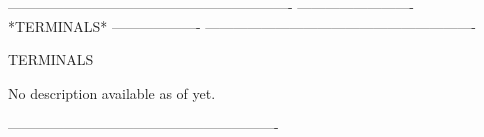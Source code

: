  
 
 
 
 
 
 
 
 
 
 
 
 
 
 
 
 
 
 
 
 
 
 
 
 
 
 
-------------------------------------------------------------
-------------------------  *TERMINALS*  -------------------
----------------------------------------------------------
 
TERMINALS
 
No description available as of yet.
 
----------------------------------------------------------
 
 
 
 
 
 
 
 
 
 
 
 
 
 
 
 
 
 
 
 
 
 
 
 
 
 
 
 
 
 
 
 
 
 
 
 
 
 
 
 
 
 
 
 
 
 
 
 
 
 
 
 
 
 
 
 
 
 
 
 
 
 
 
 
 
 
 
 
 
 
 
 
 
